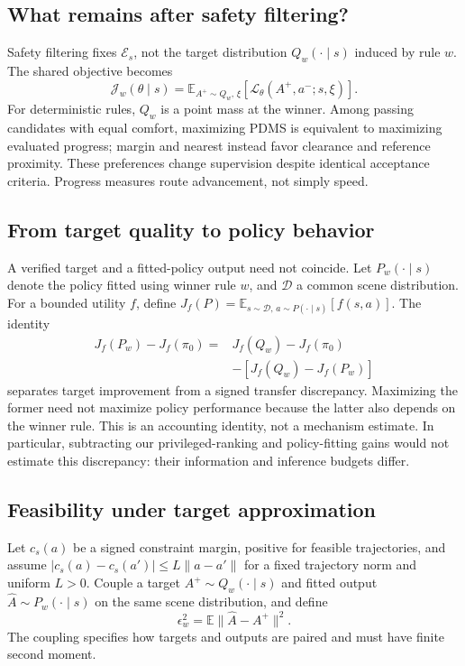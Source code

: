 \documentclass[letterpaper,10pt,conference]{ieeeconf}
\newcommand{\E}{\mathbb{E}}
\begin{document}
\subsection{What remains after safety filtering?}
\label{sec:ordering}

Safety filtering fixes $\mathcal E_s$, not the target distribution $Q_w(\cdot\mid s)$ induced by rule $w$. The shared objective becomes
\begin{equation}
\mathcal J_w(\theta\mid s)=\E_{A^+\sim Q_w,\,\xi}[\mathcal L_\theta(A^+,a^-;s,\xi)].
\label{eq:target_objective}
\end{equation}
For deterministic rules, $Q_w$ is a point mass at the winner. Among passing candidates with equal comfort, maximizing PDMS is equivalent to maximizing evaluated progress; margin and nearest instead favor clearance and reference proximity. These preferences change supervision despite identical acceptance criteria. Progress measures route advancement, not simply speed.

\subsection{From target quality to policy behavior}
A verified target and a fitted-policy output need not coincide. Let $P_w(\cdot\mid s)$ denote the policy fitted using winner rule $w$, and $\mathcal D$ a common scene distribution. For a bounded utility $f$, define $J_f(P)=\E_{s\sim\mathcal D,\,a\sim P(\cdot\mid s)}[f(s,a)]$. The identity
\begin{equation}
\begin{split}
J_f(P_w)-J_f(\pi_0)
={}&J_f(Q_w)-J_f(\pi_0)\\
&-[J_f(Q_w)-J_f(P_w)]
\end{split}
\label{eq:transfer}
\end{equation}
separates target improvement from a signed transfer discrepancy. Maximizing the former need not maximize policy performance because the latter also depends on the winner rule. This is an accounting identity, not a mechanism estimate. In particular, subtracting our privileged-ranking and policy-fitting gains would not estimate this discrepancy: their information and inference budgets differ.

\subsection{Feasibility under target approximation}
Let $c_s(a)$ be a signed constraint margin, positive for feasible trajectories, and assume $|c_s(a)-c_s(a')|\leq L\|a-a'\|$ for a fixed trajectory norm and uniform $L>0$. Couple a target $A^+\sim Q_w(\cdot\mid s)$ and fitted output $\widehat A\sim P_w(\cdot\mid s)$ on the same scene distribution, and define
\begin{equation}
\epsilon_w^2=\E\|\widehat A-A^+\|^2.
\label{eq:transfer_error}
\end{equation}
The coupling specifies how targets and outputs are paired and must have finite second moment.
\end{document}
